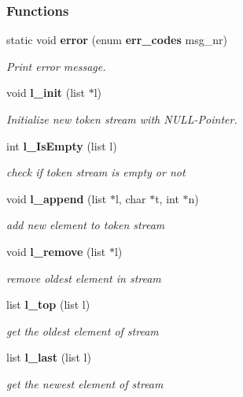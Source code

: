 \subsubsection*{\-Functions}
\begin{DoxyCompactItemize}
\item 
static void {\bf error} (enum {\bf err\-\_\-codes} msg\-\_\-nr)
\begin{DoxyCompactList}\small\item\em \-Print error message. \end{DoxyCompactList}\item 
void {\bf l\-\_\-init} (list $\ast$l)
\begin{DoxyCompactList}\small\item\em \-Initialize new token stream with \-N\-U\-L\-L-\/\-Pointer. \end{DoxyCompactList}\item 
int {\bf l\-\_\-\-Is\-Empty} (list l)
\begin{DoxyCompactList}\small\item\em check if token stream is empty or not \end{DoxyCompactList}\item 
void {\bf l\-\_\-append} (list $\ast$l, char $\ast$t, int $\ast$n)
\begin{DoxyCompactList}\small\item\em add new element to token stream \end{DoxyCompactList}\item 
void {\bf l\-\_\-remove} (list $\ast$l)
\begin{DoxyCompactList}\small\item\em remove oldest element in stream \end{DoxyCompactList}\item 
list {\bf l\-\_\-top} (list l)
\begin{DoxyCompactList}\small\item\em get the oldest element of stream \end{DoxyCompactList}\item 
list {\bf l\-\_\-last} (list l)
\begin{DoxyCompactList}\small\item\em get the newest element of stream \end{DoxyCompactList}\end{DoxyCompactItemize}
